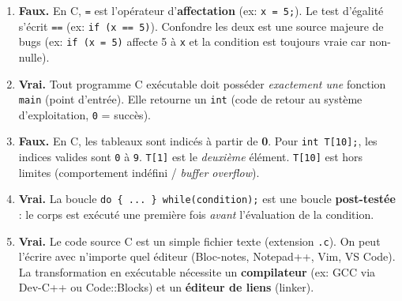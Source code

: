 \documentclass[11pt]{article}
\begin{document}
\begin{corrige}
\begin{enumerate}
  \item \textbf{Faux.} En C, \texttt{=} est l'opérateur d'\textbf{affectation} (ex: \texttt{x = 5;}). Le test d'égalité s'écrit \texttt{==} (ex: \texttt{if (x == 5)}). Confondre les deux est une source majeure de bugs (ex: \texttt{if (x = 5)} affecte 5 à \texttt{x} et la condition est toujours vraie car non-nulle).
  \item \textbf{Vrai.} Tout programme C exécutable doit posséder \emph{exactement une} fonction \texttt{main} (point d'entrée). Elle retourne un \texttt{int} (code de retour au système d'exploitation, \texttt{0} = succès).
  \item \textbf{Faux.} En C, les tableaux sont indicés à partir de \textbf{0}. Pour \texttt{int T[10];}, les indices valides sont \texttt{0} à \texttt{9}. \texttt{T[1]} est le \emph{deuxième} élément. \texttt{T[10]} est hors limites (comportement indéfini / \emph{buffer overflow}).
  \item \textbf{Vrai.} La boucle \texttt{do \{ ... \} while(condition);} est une boucle \textbf{post-testée} : le corps est exécuté une première fois \emph{avant} l'évaluation de la condition.
  \item \textbf{Vrai.} Le code source C est un simple fichier texte (extension \texttt{.c}). On peut l'écrire avec n'importe quel éditeur (Bloc-notes, Notepad++, Vim, VS Code). La transformation en exécutable nécessite un \textbf{compilateur} (ex: GCC via Dev-C++ ou Code::Blocks) et un \textbf{éditeur de liens} (linker).
\end{enumerate}
\end{corrige}
\end{document}
